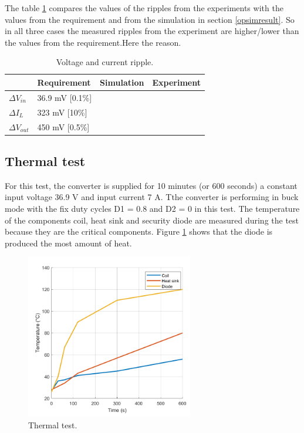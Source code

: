 The table \ref{tab:ripple} compares the values of the ripples from the experiments with the values from the requirement and from the simulation in section \ref{opsimresult}. So in all three cases the measured ripples from the experiment are higher/lower than the values from the requirement.Here the reason.

\begin{table}[H]
	\centering
	\begin{tabular}{|>{\centering}p{3.5cm}|p{3cm}|p{3cm}|p{3cm}|}
		\hline
		\rowcolor{lightgray} \textbf{} & \textbf{Requirement} & \textbf{Simulation}  & \textbf{Experiment}   \tabularnewline \hline
		$\Delta V_{in}$ & 36.9 mV [0.1\%] & &   \tabularnewline \hline
		$\Delta I_{L}$ & 323 mV [10\%]&  & \tabularnewline \hline
		$\Delta V_{out}$  & 450 mV [0.5\%]  & & \tabularnewline \hline
		
	\end{tabular}
	\caption{Voltage and current ripple.}
	\label{tab:ripple}
\end{table}


\subsection{Thermal test}

For this test, the converter is supplied for 10 minutes (or 600 seconds) a constant input voltage 36.9 V and input current 7 A. Tthe converter is performing in buck mode with the fix duty cycles D1 = 0.8 and D2 = 0 in this test. The temperature of the components coil, heat sink and security diode are measured during the test because they are the critical components. Figure \ref{Testthermal} shows that the diode is produced the most amount of heat.

\begin{figure}[H]
	\begin{center}
		\includegraphics[width=0.65\textwidth]{../Pictures/P1/Test/Thermal_test_with_heat_sink}
		\caption{Thermal test.}
		\label{Testthermal}
	\end{center}	
\end{figure}

